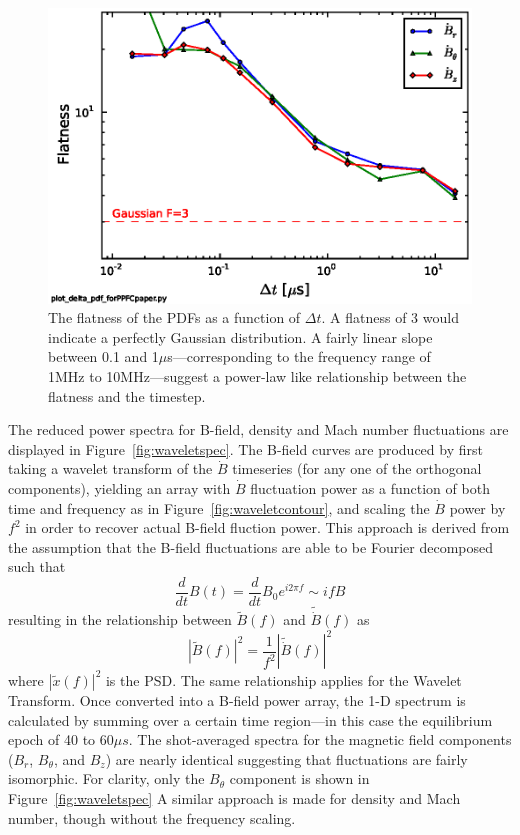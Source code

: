 \documentclass[12pt]{iopart}
\begin{document}
\begin{figure}[!htbp]
\centerline{
\includegraphics[width=16cm]{flatness.eps}}
\caption{\label{fig:flatness} The flatness of the PDFs as a function of $\Delta t$. A flatness of 3 would indicate a perfectly Gaussian distribution. A fairly linear slope between 0.1 and 1$\mu$s---corresponding to the frequency range of 1MHz to 10MHz---suggest a power-law like relationship between the flatness and the timestep.}
\end{figure}

The reduced power spectra for B-field, density and Mach number fluctuations are displayed in Figure~\ref{fig:waveletspec}. The B-field curves are produced by first taking a wavelet transform of the $\dot{B}$ timeseries (for any one of the orthogonal components), yielding an array with $\dot{B}$ fluctuation power as a function of both time and frequency as in Figure~\ref{fig:waveletcontour}, and scaling the $\dot{B}$ power by $f^{2}$ in order to recover actual B-field fluction power. This approach is derived from the assumption that the B-field fluctuations are able to be Fourier decomposed such that
%
\begin{equation}
\frac{d}{dt}B(t) = \frac{d}{dt}B_{0}e^{i2\pi f} \sim ifB
\end{equation}
%
resulting in the relationship between $\tilde{B}(f)$ and $\tilde{\dot{B}}(f)$ as
%
\begin{equation}
|\tilde{B}(f)|^{2} = \frac{1}{f^{2}}|\tilde{\dot{B}}(f)|^{2}
\end{equation}
%
where $|\tilde{x}(f)|^{2}$ is the PSD. The same relationship applies for the Wavelet Transform. Once converted into a B-field power array, the 1-D spectrum is calculated by summing over a certain time region---in this case the equilibrium epoch of 40 to 60$\mu s$. The shot-averaged spectra for the magnetic field components ($B_{r}$, $B_{\theta}$, and $B_{z}$) are nearly identical suggesting that fluctuations are fairly isomorphic. For clarity, only the $B_{\theta}$ component is shown in Figure~\ref{fig:waveletspec}  A similar approach is made for density and Mach number, though without the frequency scaling.
\end{document}
